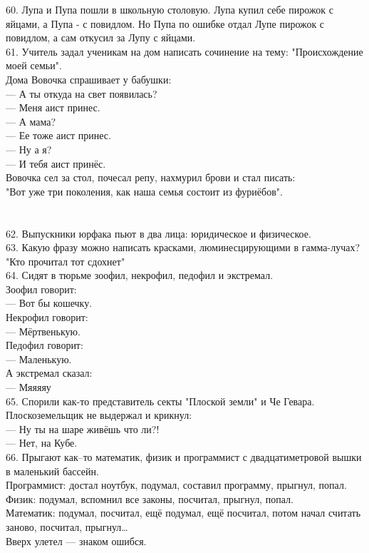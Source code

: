 \documentclass[a4paper,20pt,notitlepage]{extbook}
\begin{document}
	60. Лупа и Пупа пошли в школьную столовую. Лупа купил себе пирожок с яйцами, а Пупа - с повидлом. Но Пупа по ошибке отдал Лупе пирожок с повидлом, а сам откусил за Лупу с яйцами. \\
	
	61. Учитель задал ученикам на дом написать сочинение на тему: "Происхождение моей семьи".\\
	 Дома Вовочка спрашивает у бабушки:\\
	— А ты откуда на свет появилась?\\
	— Меня аист принес.\\
	— А мама?\\
	— Ее тоже аист принес.\\
	— Ну а я?\\
	— И тебя аист принёс.\\
	Вовочка сел за стол, почесал репу, нахмурил брови и стал писать: \\
	"Вот уже три поколения, как наша семья состоит из фуриёбов".\\
	~\\
	\\
	62. Выпускники юрфака пьют в два лица: юридическое и физическое.\\
	
	63. Какую фразу можно написать красками, люминесцирующими в гамма-лучах?\\
	"Кто прочитал тот сдохнет"\\
	
	64. Сидят в тюрьме зоофил, некрофил, педофил и экстремал.\\
	Зоофил говорит:\\
	— Вот бы кошечку.\\
	Некрофил говорит:\\
	— Мёртвенькую.\\
	Педофил говорит:\\
	— Маленькую.\\
	А экстремал сказал:\\
	— Мяяяяу\\
	
	65. Спорили как-то представитель секты "Плоской земли" и Че Гевара. \\
	Плоскоземельщик не выдержал и крикнул:\\
	— Ну ты на шаре живёшь что ли?!\\
	— Нет, на Кубе.\\
	 
	66. Прыгают как–то математик, физик и программист с двадцатиметровой вышки в маленький бассейн.\\
	Программист: достал ноутбук, подумал, составил программу, прыгнул, попал.\\
	Физик: подумал, вспомнил все законы, посчитал, прыгнул, попал.\\
	Математик: подумал, посчитал, ещё подумал, ещё посчитал, потом начал считать заново, посчитал, прыгнул… \\
	Вверх улетел — знаком ошибся. \\
	
\end{document}
